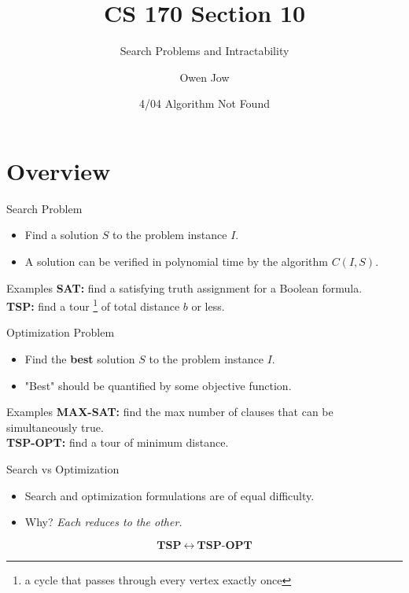 \documentclass[10pt, xcolor={table, dvipsnames}, t]{beamer}
\title{CS 170 Section 10}
\subtitle{Search Problems and Intractability}
\author{Owen Jow\vspace{-1.5ex}}
\institute{owenjow@berkeley.edu\vspace{1.5ex}}
\date{4/04 Algorithm Not Found}
\begin{document}
\begin{frame}
\titlepage
\end{frame}

\section{Overview}

\begin{frame}{Search Problem}

\begin{itemize}
\item Find a solution $S$ to the problem instance $I$.
\item A solution can be verified in polynomial time by the algorithm $C(I, S)$.
\end{itemize}

\begin{block}{Examples}
\textbf{SAT:} find a satisfying truth assignment for a Boolean formula. \\
\textbf{TSP:} find a tour \footnote{a cycle that passes through every vertex exactly once \vspace{7mm}} of total distance $b$ or less.
\end{block}

\end{frame}

\begin{frame}{Optimization Problem}

\begin{itemize}
\item Find the \textbf{best} solution $S$ to the problem instance $I$.
\item "Best" should be quantified by some objective function.
\end{itemize}

\begin{block}{Examples}
\textbf{MAX-SAT:} find the max number of clauses that can be simultaneously true. \\
\textbf{TSP-OPT:} find a tour of minimum distance.
\end{block}

\end{frame}

\begin{frame}{Search vs Optimization}

\begin{itemize}
\item Search and optimization formulations are of equal difficulty.
\item Why? \textit{Each reduces to the other.}
\end{itemize}

$$\textbf{TSP}\ \longleftrightarrow\ \textbf{TSP-OPT}$$

\end{frame}
\end{document}
